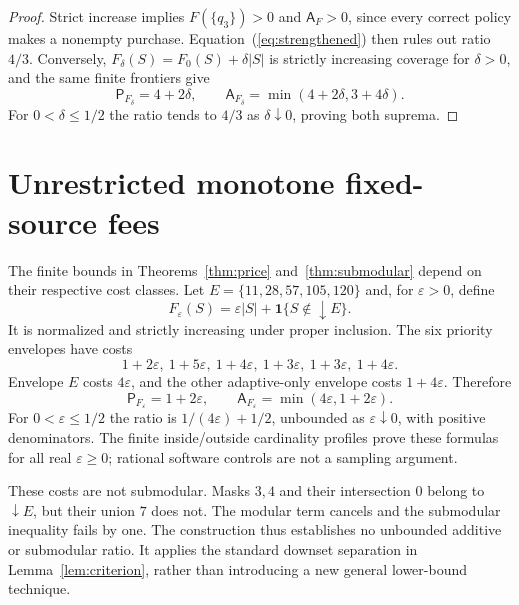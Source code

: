 \documentclass[pdflatex,sn-mathphys-num]{sn-jnl}
\newcommand{\A}{\mathsf{A}}
\newcommand{\Pcost}{\mathsf{P}}
\newcommand{\down}{\mathop{\downarrow}}
\theoremstyle{thmstyleone}
\theoremstyle{thmstylethree}
\theoremstyle{thmstyletwo}
\begin{document}
\begin{proof}
Strict increase implies $F(\{q_3\})>0$ and $\A_F>0$, since every correct policy makes a nonempty purchase. Equation~(\ref{eq:strengthened}) then rules out ratio $4/3$. Conversely, $F_\delta(S)=F_0(S)+\delta|S|$ is strictly increasing coverage for $\delta>0$, and the same finite frontiers give
\[
 \Pcost_{F_\delta}=4+2\delta,\qquad
 \A_{F_\delta}=\min(4+2\delta,3+4\delta).
\]
For $0<\delta\leq1/2$ the ratio tends to $4/3$ as $\delta\downarrow0$, proving both suprema.
\end{proof}

\section{Unrestricted monotone fixed-source fees}\label{app:monotone-fees}
The finite bounds in Theorems~\ref{thm:price} and~\ref{thm:submodular} depend on their respective cost classes. Let $E=\{11,28,57,105,120\}$ and, for $\varepsilon>0$, define
\[
 F_\varepsilon(S)=\varepsilon|S|+\mathbf{1}\{S\notin\down E\}.
\]
It is normalized and strictly increasing under proper inclusion. The six priority envelopes have costs
\[
1+2\varepsilon,\ 1+5\varepsilon,\ 1+4\varepsilon,\
1+3\varepsilon,\ 1+3\varepsilon,\ 1+4\varepsilon.
\]
Envelope $E$ costs $4\varepsilon$, and the other adaptive-only envelope costs $1+4\varepsilon$. Therefore
\[
 \Pcost_{F_\varepsilon}=1+2\varepsilon,\qquad
 \A_{F_\varepsilon}=\min(4\varepsilon,1+2\varepsilon).
\]
For $0<\varepsilon\leq1/2$ the ratio is $1/(4\varepsilon)+1/2$, unbounded as $\varepsilon\downarrow0$, with positive denominators. The finite inside/outside cardinality profiles prove these formulas for all real $\varepsilon\geq0$; rational software controls are not a sampling argument.

These costs are not submodular. Masks $3,4$ and their intersection $0$ belong to $\down E$, but their union $7$ does not. The modular term cancels and the submodular inequality fails by one. The construction thus establishes no unbounded additive or submodular ratio. It applies the standard downset separation in Lemma~\ref{lem:criterion}, rather than introducing a new general lower-bound technique.
\end{document}
